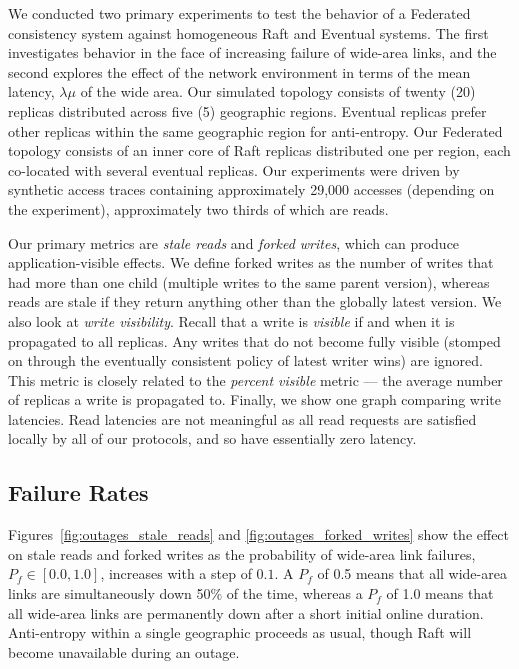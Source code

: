\documentclass[10pt,conference,letterpaper]{IEEEtran}
\begin{document}
We conducted two primary experiments to test the behavior of a Federated consistency
system against homogeneous Raft and Eventual systems.
The first investigates behavior in the face of increasing failure of wide-area
links, and the
second explores the effect of the network environment in terms of the mean latency,
$\lambda{\mu}$ of the wide area.
Our simulated topology consists of twenty (20) replicas distributed across five (5)
geographic regions.
Eventual replicas prefer other replicas within the same geographic region for
anti-entropy.
Our Federated topology consists of an inner core of Raft replicas distributed one per region,
each co-located with several eventual replicas.
Our experiments were driven by synthetic access traces containing approximately 29,000
accesses (depending on the experiment), approximately two thirds of which are reads.

Our primary metrics are \textit{stale reads} and \textit{forked writes}, which can produce
application-visible effects.
We define forked writes as the number of writes that had more than one child (multiple
writes to the same parent version), whereas reads are stale if they return anything other
than the globally latest version.
We also look at \emph{write visibility}.
Recall that a write is \emph{visible} if and when it is propagated to all replicas.
Any writes that do not become fully visible (stomped on through the eventually consistent
policy of latest writer wins) are ignored.
This metric is closely related to the \textit{percent visible} metric --- the average
number of replicas a write is propagated to.
Finally, we show one graph comparing write latencies.
Read latencies are not meaningful as all read requests are satisfied locally by all of our
protocols, and so have essentially zero latency.

\subsection{Failure Rates}

Figures~\ref{fig:outages_stale_reads} and \ref{fig:outages_forked_writes}
show the effect on stale reads and forked writes
as the probability of wide-area link failures, $P_f \in [0.0,1.0]$, increases
with a step of $0.1$.
A $P_f$ of 0.5 means that all wide-area links are simultaneously down 50\% of
the time,
whereas a $P_f$ of 1.0 means that all wide-area links are permanently down after
a short initial online duration.
Anti-entropy within a single geographic proceeds as usual, though Raft will become unavailable during an outage.
\end{document}
